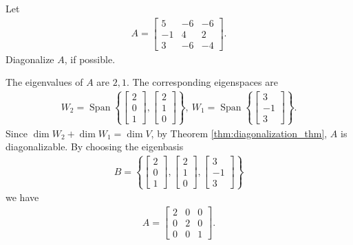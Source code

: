 \documentclass[12pt,letterpaper,reqno]{article}
\numberwithin{equation}{section}
\DeclareMathOperator{\Span}{Span}
\begin{document}
\begin{exercise}
Let 
\begin{align*}
	A=\begin{bmatrix}
		5 & -6 & -6 \\
		-1 & 4 & 2 \\
		3 & -6 & -4
	\end{bmatrix}.
\end{align*}	
Diagonalize $A$, if possible.
\end{exercise}

{\color{red} \flushleft \begin{solution}
 The eigenvalues of $A$ are $2,1$. The corresponding eigenspaces are
 \begin{align*}
 	W_2=\Span\left\{\begin{bmatrix}
 		2 \\ 0 \\ 1
 	\end{bmatrix}, \begin{bmatrix}
 		2 \\ 1 \\ 0
 	\end{bmatrix}\right\}, \ W_1=\Span\left\{\begin{bmatrix}
 		3 \\ -1 \\ 3
 	\end{bmatrix}\right\}.
 \end{align*}	
 Since $\dim W_2+\dim W_1=\dim V$, by Theorem \ref{thm:diagonalization_thm}, $A$ is diagonalizable. By choosing the eigenbasis 
 \begin{align*}
 	B=\left\{\begin{bmatrix}
 		2 \\ 0 \\ 1
 	\end{bmatrix}, \begin{bmatrix}
 		2 \\ 1 \\ 0
 	\end{bmatrix}, \begin{bmatrix}
 		3 \\ -1 \\ 3
 	\end{bmatrix}\right\}
 \end{align*}
 we have 
 \begin{align*}
 	A=\begin{bmatrix}
 		2 & 0 & 0 \\
 		0 & 2 & 0 \\
 		0 & 0 & 1
 	\end{bmatrix}.
 \end{align*}
 \end{solution}}
\end{document}
